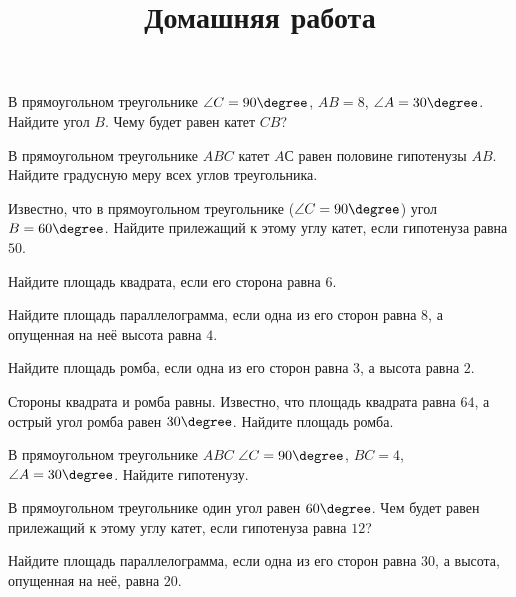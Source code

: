 \begin{consultation}
	\begin{listofex}
		\item В прямоугольном треугольнике \( \angle C=90\degree \), \( AB=8 \), \( \angle A=30\degree \). Найдите угол \( B \). Чему будет равен катет \( CB \)?
		\item В прямоугольном треугольнике \( ABC \) катет \( AС \) равен половине гипотенузы \( AB \). Найдите градусную меру всех углов треугольника.
		\item Известно, что в прямоугольном треугольнике (\( \angle C=90\degree \)) угол \( B=60\degree \). Найдите прилежащий к этому углу катет, если гипотенуза равна \( 50 \).
		\item Найдите площадь квадрата, если его сторона равна \( 6 \).
		\item Найдите площадь параллелограмма, если одна из его сторон равна \( 8 \), а опущенная на неё высота равна \( 4 \).
		\item Найдите площадь ромба, если одна из его сторон равна \( 3 \), а высота равна \( 2 \).
		\item Стороны квадрата и ромба равны. Известно, что площадь квадрата равна \( 64 \), а острый угол ромба равен \( 30\degree \). Найдите площадь ромба.
	\end{listofex}
	\newpage
	\title{Домашняя работа}
	\begin{listofex}
		\item В прямоугольном треугольнике \( ABC \) \( \angle C=90\degree \), \( BC=4 \), \( \angle A=30\degree \). Найдите гипотенузу.
		\item В прямоугольном треугольнике один угол равен \( 60\degree \). Чем будет равен прилежащий к этому углу катет, если гипотенуза равна \( 12 \)?
		\item Найдите площадь параллелограмма, если одна из его сторон равна \( 30 \), а высота, опущенная на неё, равна \( 20 \).
	\end{listofex}
\end{consultation}
